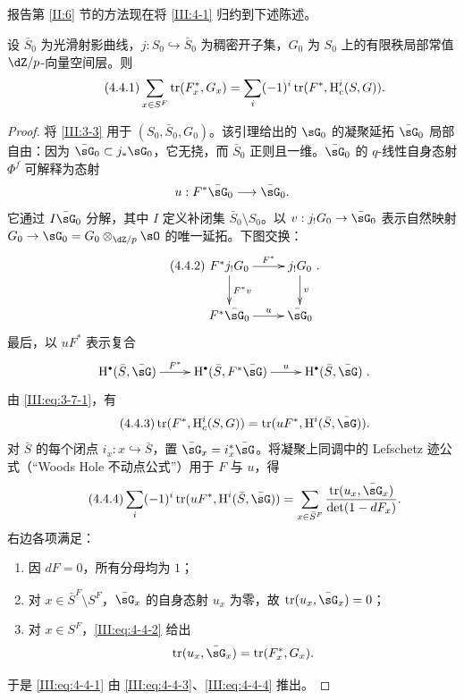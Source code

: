 \subsection{}\label{III:4-4}
报告第 \ref{II:6} 节的方法现在将 \ref{III:4-1} 归约到下述陈述。
\begin{theorem*}[4.1 bis]\label{III:4-1bis}
设 $\bar S_0$ 为光滑射影曲线，$j:S_0\hookrightarrow\bar S_0$ 为稠密开子集，$G_0$ 为 $S_0$ 上的有限秩局部常值 $\dZ/p$-向量空间层。则
\begin{equation*}\tag{4.4.1}\label{III:eq:4-4-1}
\sum_{x\in S^F}\operatorname{tr}(F_x^*,G_x)=\sum_i(-1)^i\operatorname{tr}(F^*,\operatorname{H}_c^i(S,G)).
\end{equation*}
\end{theorem*}
\begin{proof}
将 \ref{III:3-3} 用于 $(S_0,\bar S_0,G_0)$。该引理给出的 $\sG_0$ 的凝聚延拓 $\bar\sG_0$ 局部自由：因为 $\bar\sG_0\subset j_*\sG_0$，它无挠，而 $\bar S_0$ 正则且一维。$\bar\sG_0$ 的 $q$-线性自身态射 $\Phi^f$ 可解释为态射
\[u:F^*\bar\sG_0\longrightarrow\bar\sG_0.\]
它通过 $I\bar\sG_0$ 分解，其中 $I$ 定义补闭集 $\bar S_0\setminus S_0$。以 $v:j_!G_0\to\bar\sG_0$ 表示自然映射 $G_0\to\sG_0=G_0\otimes_{\dZ/p}\sO$ 的唯一延拓。下图交换：
\begin{equation*}\tag{4.4.2}\label{III:eq:4-4-2}
\xymatrix{F^*j_!G_0\ar[r]^-{F^*}\ar[d]^-{F^*v}&j_!G_0\ar[d]^-v\\F^*\bar\sG_0\ar[r]^-u&\bar\sG_0}.
\end{equation*}
最后，以 $uF^*$ 表示复合
\[\xymatrix{\h^\bullet(\bar S,\bar\sG)\ar[r]^-{F^*}&\h^\bullet(\bar S,F^*\bar\sG)\ar[r]^-u&\h^\bullet(\bar S,\bar\sG)}.\]
由 \eqref{III:eq:3-7-1}，有
\begin{equation*}\tag{4.4.3}\label{III:eq:4-4-3}
\tr(F^*,\h_c^i(S,G))=\tr(uF^*,\h^i(\bar S,\bar\sG)).
\end{equation*}
对 $\bar S$ 的每个闭点 $i_x:x\hookrightarrow\bar S$，置 $\bar\sG_x=i_x^*\bar\sG$。将凝聚上同调中的 Lefschetz 迹公式（“Woods Hole 不动点公式”）用于 $F$ 与 $u$，得
\begin{equation*}\tag{4.4.4}\label{III:eq:4-4-4}
\sum_i(-1)^i\tr(uF^*,\h^i(\bar S,\bar\sG))=\sum_{x\in\bar S^F}\frac{\tr(u_x,\bar\sG_x)}{\det(1-dF_x)}.
\end{equation*}
右边各项满足：
\begin{enumerate}[\indent a)]
\item 因 $dF=0$，所有分母均为 $1$；
\item 对 $x\in\bar S^F\setminus S^F$，$\bar\sG_x$ 的自身态射 $u_x$ 为零，故 $\tr(u_x,\bar\sG_x)=0$；
\item 对 $x\in S^F$，\eqref{III:eq:4-4-2} 给出
\[\tr(u_x,\bar\sG_x)=\tr(F_x^*,G_x).\]
\end{enumerate}
于是 \eqref{III:eq:4-4-1} 由 \eqref{III:eq:4-4-3}、\eqref{III:eq:4-4-4} 推出。
\end{proof}

